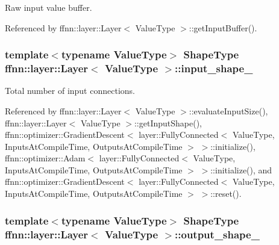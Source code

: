 Raw input value buffer. 



Referenced by ffnn\-::layer\-::\-Layer$<$ Value\-Type $>$\-::get\-Input\-Buffer().

\hypertarget{classffnn_1_1layer_1_1_layer_a07cc49b6890743a8045e3adc7c07aca5}{
\subsubsection[{input\-\_\-shape\-\_\-}]{\setlength{\rightskip}{0pt plus 5cm}template$<$typename Value\-Type$>$ {\bf Shape\-Type} {\bf ffnn\-::layer\-::\-Layer}$<$ Value\-Type $>$\-::input\-\_\-shape\-\_\-\hspace{0.3cm}{\ttfamily [protected]}}}\label{classffnn_1_1layer_1_1_layer_a07cc49b6890743a8045e3adc7c07aca5}


Total number of input connections. 



Referenced by ffnn\-::layer\-::\-Layer$<$ Value\-Type $>$\-::evaluate\-Input\-Size(), ffnn\-::layer\-::\-Layer$<$ Value\-Type $>$\-::get\-Input\-Shape(), ffnn\-::optimizer\-::\-Gradient\-Descent$<$ layer\-::\-Fully\-Connected$<$ Value\-Type, Inputs\-At\-Compile\-Time, Outputs\-At\-Compile\-Time $>$ $>$\-::initialize(), ffnn\-::optimizer\-::\-Adam$<$ layer\-::\-Fully\-Connected$<$ Value\-Type, Inputs\-At\-Compile\-Time, Outputs\-At\-Compile\-Time $>$ $>$\-::initialize(), and ffnn\-::optimizer\-::\-Gradient\-Descent$<$ layer\-::\-Fully\-Connected$<$ Value\-Type, Inputs\-At\-Compile\-Time, Outputs\-At\-Compile\-Time $>$ $>$\-::reset().

\hypertarget{classffnn_1_1layer_1_1_layer_a453330bda96277cd7b794bfab4804c47}{
\subsubsection[{output\-\_\-shape\-\_\-}]{\setlength{\rightskip}{0pt plus 5cm}template$<$typename Value\-Type$>$ {\bf Shape\-Type} {\bf ffnn\-::layer\-::\-Layer}$<$ Value\-Type $>$\-::output\-\_\-shape\-\_\-\hspace{0.3cm}{\ttfamily [protected]}}}\label{classffnn_1_1layer_1_1_layer_a453330bda96277cd7b794bfab4804c47}


